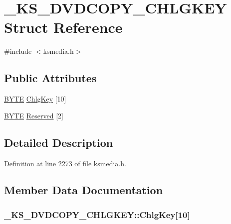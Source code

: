 \hypertarget{struct___k_s___d_v_d_c_o_p_y___c_h_l_g_k_e_y}{}\section{\+\_\+\+K\+S\+\_\+\+D\+V\+D\+C\+O\+P\+Y\+\_\+\+C\+H\+L\+G\+K\+EY Struct Reference}
\label{struct___k_s___d_v_d_c_o_p_y___c_h_l_g_k_e_y}


{\ttfamily \#include $<$ksmedia.\+h$>$}

\subsection*{Public Attributes}
\begin{DoxyCompactItemize}
\item 
\hyperlink{mapinls_8h_a4ae1dab0fb4b072a66584546209e7d58}{B\+Y\+TE} \hyperlink{struct___k_s___d_v_d_c_o_p_y___c_h_l_g_k_e_y_a7e4dac0f0e2025dfcef0c84650166610}{Chlg\+Key} \mbox{[}10\mbox{]}
\item 
\hyperlink{mapinls_8h_a4ae1dab0fb4b072a66584546209e7d58}{B\+Y\+TE} \hyperlink{struct___k_s___d_v_d_c_o_p_y___c_h_l_g_k_e_y_a7b2d5739ced0b96b64c928e568d937f1}{Reserved} \mbox{[}2\mbox{]}
\end{DoxyCompactItemize}


\subsection{Detailed Description}


Definition at line 2273 of file ksmedia.\+h.



\subsection{Member Data Documentation}
\subsubsection[{\texorpdfstring{Chlg\+Key}{ChlgKey}}]{ \+\_\+\+K\+S\+\_\+\+D\+V\+D\+C\+O\+P\+Y\+\_\+\+C\+H\+L\+G\+K\+E\+Y\+::\+Chlg\+Key\mbox{[}10\mbox{]}}\hypertarget{struct___k_s___d_v_d_c_o_p_y___c_h_l_g_k_e_y_a7e4dac0f0e2025dfcef0c84650166610}{}\label{struct___k_s___d_v_d_c_o_p_y___c_h_l_g_k_e_y_a7e4dac0f0e2025dfcef0c84650166610}


